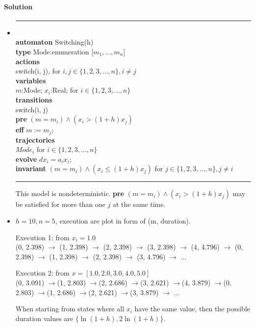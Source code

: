 \documentclass[11pt]{article}
\newcommand{\tab}{\hspace*{5mm}}
\begin{document}
\paragraph{Solution}
\begin{itemize}[(a)]
\item
\noindent\rule{7cm}{1.0pt}\\
\textbf{automaton} Switching(h)\\
\tab\textbf{type} Mode:enumeration [$m_1, \ldots, m_n$]\\
\tab\textbf{actions}\\
\tab\tab switch(i, j), for $i,j \in \{1,2,3,\ldots,n\}, i \neq j$\\
\tab\textbf{variables}\\
\tab\tab $m$:Mode; $x_i$:Real; for $i \in \{1,2,3,\ldots,n\}$\\
\tab\textbf{transitions}\\
\tab\tab switch(i, j)\\
\tab\tab \textbf{pre} $(m = m_i) \wedge (x_i > (1+h)x_j)$\\
\tab\tab \textbf{eff} $m := m_j$;\\
\tab\textbf{trajectories}\\
\tab\tab $Mode_i$ for $i \in \{1,2,3,\ldots,n\}$\\
\tab\tab \textbf{evolve} $dx_i = a_i x_i$;\\
\tab\tab \textbf{invariant} $(m = m_i) \wedge (x_i \leq (1+h)x_j)$ for $j \in \{1,2,3,\ldots,n\}, j \neq i$\\

\noindent\rule{7cm}{1.0pt}

This model is nondeterministic. \textbf{pre} $(m = m_i) \wedge (x_i > (1+h)x_j)$ may be satisfied for more than one $j$ at the same time.

\item
$h=10, n=5$, execution are plot in form of (m, duration).

Execution 1: from $x_i = 1.0$\\
(0, 2.398) $\rightarrow$ (1, 2.398) $\rightarrow$ (2, 2.398) $\rightarrow$ (3, 2.398) $\rightarrow$ (4, 4.796) $\rightarrow$ (0, 2.398) $\rightarrow$ (1, 2.398) $\rightarrow$ (2, 2.398) $\rightarrow$ (3, 4.796) $\rightarrow$ $\ldots$

Execution 2: from $x = [1.0, 2.0, 3.0, 4.0, 5.0]$\\
(0, 3.091) $\rightarrow$(1, 2.803) $\rightarrow$(2, 2.686) $\rightarrow$(3, 2.621) $\rightarrow$(4, 3.879) $\rightarrow$(0, 2.803) $\rightarrow$(1, 2.686) $\rightarrow$(2, 2.621) $\rightarrow$(3, 3.879) $\rightarrow$ $\ldots$

When starting from states where all $x_i$ have the same value, then the possible duration values are $\{\ln(1+h), 2\ln(1+h)\}$.
\end{itemize}
\end{document}
